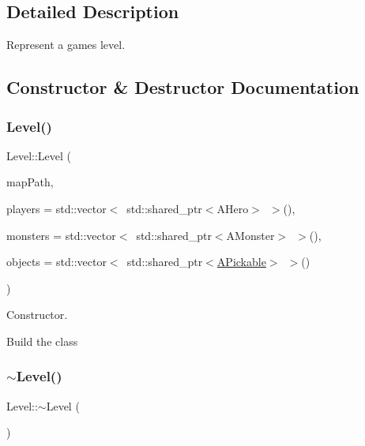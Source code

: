 \subsection{Detailed Description}
Represent a game\textquotesingle{}s level. 

\subsection{Constructor \& Destructor Documentation}
\mbox{\label{classLevel_a1cddef79da66a80002686199a847543f}} 
\subsubsection{\texorpdfstring{Level()}{Level()}}
{\footnotesize\ttfamily Level\+::\+Level (\begin{DoxyParamCaption}\item[{const W\+String \&}]{map\+Path,  }\item[{std\+::vector$<$ std\+::shared\+\_\+ptr$<$ A\+Hero $>$ $>$}]{players = {\ttfamily std\+:\+:vector$<$~std\+:\+:shared\+\_\+ptr$<$AHero$>$~$>$()},  }\item[{std\+::vector$<$ std\+::shared\+\_\+ptr$<$ A\+Monster $>$ $>$}]{monsters = {\ttfamily std\+:\+:vector$<$~std\+:\+:shared\+\_\+ptr$<$AMonster$>$~$>$()},  }\item[{std\+::vector$<$ std\+::shared\+\_\+ptr$<$ \hyperlink{classAPickable}{A\+Pickable} $>$ $>$}]{objects = {\ttfamily std\+:\+:vector$<$~std\+:\+:shared\+\_\+ptr$<$\hyperlink{classAPickable}{A\+Pickable}$>$~$>$()} }\end{DoxyParamCaption})}



Constructor. 

Build the class \mbox{\label{classLevel_a249eac1e8f19ff44134efa5e986feaca}} 
\subsubsection{\texorpdfstring{$\sim$\+Level()}{~Level()}}
{\footnotesize\ttfamily Level\+::$\sim$\+Level (\begin{DoxyParamCaption}{ }\end{DoxyParamCaption})}



